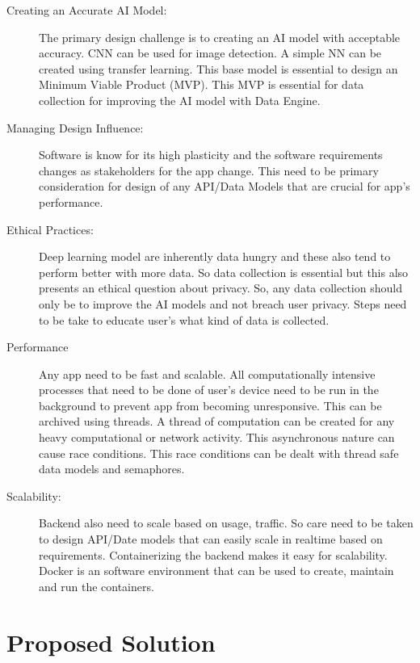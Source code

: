 \documentclass[../Report.tex]{subfiles}
\begin{document}
\begin{description}
    \item[Creating an Accurate AI Model: ] The primary design challenge is to creating an AI model with acceptable accuracy. CNN
    can be used for image detection. A simple NN can be created using transfer learning. This base model is essential to design an 
    Minimum Viable Product (MVP). This MVP is essential for data collection for improving the AI model with Data Engine.
    
    \item[Managing Design Influence: ] Software is know for its high plasticity and the software requirements changes as stakeholders for
    the app change. This need to be primary consideration for design of any API/Data Models that are crucial for app's performance.

    \item[Ethical Practices: ] Deep learning model are inherently data hungry and these also tend to perform better with more data. So
    data collection is essential but this also presents an ethical question about privacy. So, any data collection should only be to 
    improve the AI models and not breach user privacy. Steps need to be take to educate user's what kind of data is collected.

    \item[Performance] Any app need to be fast and scalable. All computationally intensive processes that need to be 
    done of user's device need to be run in the background to prevent app from becoming unresponsive. This can be archived using 
    threads. A thread of computation can be created for any heavy computational or network activity. This asynchronous nature can 
    cause race conditions. This race conditions can be dealt with thread safe data models and semaphores.
    
    \item[Scalability: ]
    Backend also need to scale based on usage, traffic. So care need to be taken to design API/Date models that can easily scale in 
    realtime based on requirements. Containerizing the backend makes it easy for scalability. Docker is an software environment that
    can be used to create, maintain and run the containers.
\end{description}

\section{Proposed Solution}
\end{document}
